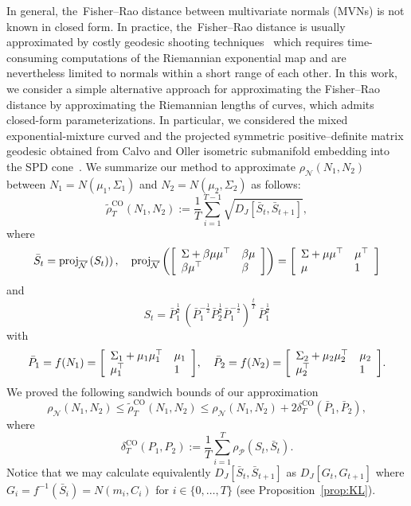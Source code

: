 \documentclass[entropy,article,accept,oneauthor,pdftex,entropy]{Definitions/mdpi}
\def\barS{\bar{S}}
\def\proj{\mathrm{proj}}
\def\barN{{\overline{\mathcal{N}}}}
\def\CO{\mathrm{CO}}
\def\mattwotwo#1#2#3#4{{\left[\begin{array}{ll}#1 & #2\cr #3 & #4\end{array}\right]}}
\def\calN{\mathcal{N}}
\def\calP{\mathcal{P}}
\def\barP{{\bar P}}
\begin{document}
In general, the~Fisher--Rao distance between multivariate normals (MVNs) is not known in closed form.
In practice, the~Fisher--Rao distance is usually approximated by costly geodesic shooting techniques~\cite{MVNGeodesicShooting-2014,GeodesicShooting-2016,barbaresco2019souriau}  which requires time-consuming computations of the Riemannian exponential map and are nevertheless limited to normals within a short range of each other. 
In this work, we consider a simple alternative approach for approximating the Fisher--Rao distance by approximating the Riemannian lengths of curves, which admits closed-form parameterizations. 
In particular, we considered the mixed exponential-mixture curved and the projected symmetric positive–definite matrix geodesic obtained from Calvo and Oller isometric submanifold embedding into the SPD cone~\cite{SDPMVN-1990}.
We summarize our method to approximate $\rho_\calN(N_1,N_2)$ between $N_1=N(\mu_1,\Sigma_1)$ and $N_2=N(\mu_2,\Sigma_2)$ as follows:
$$
\tilde\rho_T^\CO(N_1,N_2) := 
\frac{1}{T} \sum_{i=1}^{T-1} \sqrt{D_J\left[\barS_t,\barS_{t+1}\right]},
$$
where 
$$
\barS_t=\proj_{\barN}\left(S_t)\right),\quad  
\proj_{\barN}\left(\mattwotwo{\Sigma+\beta\mu\mu^\top}{\beta\mu}{\beta\mu^\top}{\beta}\right)=\mattwotwo{\Sigma+\mu\mu^\top}{\mu^\top}{\mu}{1}
$$
and
$$
S_t=\barP_1^{\frac{1}{2}} \, \left(\barP_1^{-\frac{1}{2}}\barP_2^{\frac{1}{2}}\barP_1^{-\frac{1}{2}}\right)^{\frac{t}{T}}
 \, \barP_1^{\frac{1}{2}}
$$
with 
$$
\barP_1=f(N_1)=\mattwotwo{\Sigma_1+\mu_1\mu_1^\top}{\mu_1}{\mu_1^\top}{1},\quad \barP_2=f(N_2)=\mattwotwo{\Sigma_2+\mu_2\mu_2^\top}{\mu_2}{\mu_2^\top}{1}.
$$
We proved the following sandwich bounds of our approximation
$$
\rho_\calN(N_1,N_2)\leq \tilde\rho_T^\CO(N_1,N_2) \leq  \rho_\calN(N_1,N_2) + 2 \delta^\CO_T(\bar P_1,\bar P_2),
$$
where
$$
\delta^\CO_T(P_1,P_2):=\frac{1}{T}\sum_{i=1}^T  \rho_\calP(S_t,\bar{S}_t).
$$
Notice that we may  calculate equivalently $D_J\left[\barS_t,\barS_{t+1}\right]$ as $D_J[G_t,G_{t+1}]$ where $G_i=f^{-1}(\barS_i)=N(m_i,C_i)$ for $i\in\{0,\ldots,T\}$ (see Proposition~\ref{prop:KL}).
\end{document}
